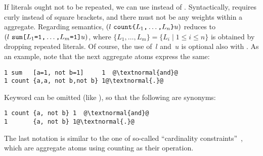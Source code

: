 If literals ought not to be repeated,
we can use  instead of .
Syntactically,  requires curly instead of square
brackets, and there must not be any weights within a  aggregate.
Regarding semantics,
$(
  l~ 
  \const{count} 
  \code{\char`\{}
  L_1\code{,}
  \dots\code{,}
  L_n
  \code{\char`\}}
  u
)$ 
reduces to
$(
  l~ 
  \texttt{sum} 
  \texttt{[}
  L_1\texttt{=}\texttt{1}\texttt{,}
  \dots\texttt{,}
  L_m\texttt{=}\texttt{1}
  \texttt{]}
  u
)$,
where $\{L_1,\dots,L_m\}=\{L_i \mid 1\leq i\leq n\}$ is obtained by dropping
repeated literals.
Of course, the use of~$l$ and~$u$ is optional also with .
As an example, note that the next aggregate atoms express the same:
\begin{lstlisting}[numbers=none,escapechar=@]
1 sum   [a=1, not b=1]     1  @\textnormal{and}@ 
1 count {a,a, not b,not b} 1@\textnormal{.}@  
\end{lstlisting}
Keyword  can be omitted (like ),
so that the following are synonyms:
\begin{lstlisting}[numbers=none,escapechar=@]
1 count {a, not b} 1  @\textnormal{and}@ 
1       {a, not b} 1@\textnormal{.}@  
\end{lstlisting}
The last notation is similar to the one of so-called
``cardinality constraints''~\cite{siniso02a,lparseManual},
which are aggregate atoms using counting as their operation.

